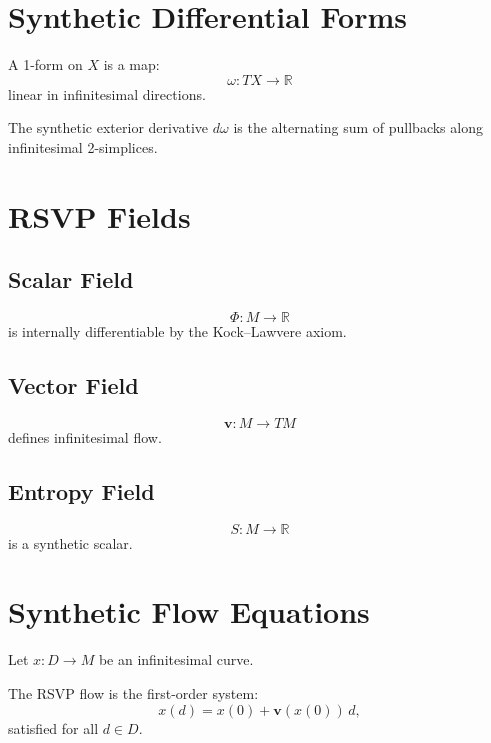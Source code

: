 \section{Synthetic Differential Forms}

\begin{definition}[1-Form]
A 1-form on $X$ is a map:
\[
\omega : TX \to \mathbb{R}
\]
linear in infinitesimal directions.
\end{definition}

\begin{definition}
The synthetic exterior derivative $d\omega$ is the alternating sum of pullbacks along infinitesimal 2-simplices.
\end{definition}

\section{RSVP Fields}

\subsection{Scalar Field}

\[
\Phi : M\to \mathbb{R}
\]
is internally differentiable by the Kock–Lawvere axiom.

\subsection{Vector Field}

\[
\mathbf{v} : M \to TM
\]
defines infinitesimal flow.

\subsection{Entropy Field}

\[
S : M\to \mathbb{R}
\]
is a synthetic scalar.

\section{Synthetic Flow Equations}

Let $x : D \to M$ be an infinitesimal curve.

\begin{definition}
The RSVP flow is the first-order system:
\[
x(d) = x(0) + \mathbf{v}(x(0))\, d,
\]
satisfied for all $d\in D$.
\end{definition}

